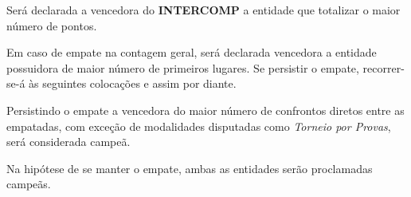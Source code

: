 \begin{article}
	Será declarada a vencedora do \textbf{INTERCOMP} a entidade que totalizar o maior número de pontos.

	\begin{xparagraph}
		Em caso de empate na contagem geral, será declarada vencedora a entidade possuidora de maior número de primeiros lugares. Se persistir o empate, recorrer-se-á às seguintes colocações e assim por diante.
	\end{xparagraph}

	\begin{xparagraph}
		Persistindo o empate a vencedora do maior número de confrontos diretos entre as empatadas, com exceção de modalidades disputadas como \textit{Torneio por Provas}, será considerada campeã.
	\end{xparagraph}

	\begin{xparagraph}
		Na hipótese de se manter o empate, ambas as entidades serão proclamadas campeãs.
	\end{xparagraph}
\end{article}
